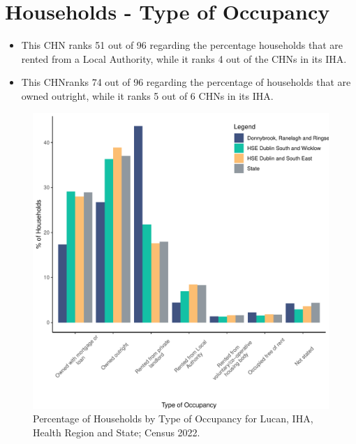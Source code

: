 \documentclass{article}
\begin{document}
\section{Households - Type of Occupancy}\label{sect:Households}
\begin{itemize}
\item This CHN ranks  51 out of 96 regarding the percentage households that are rented from a Local Authority, while it ranks  4 out of the CHNs in its IHA. 
\item This CHNranks  74 out of 96 regarding the percentage of households that are owned outright, while it ranks   5 out of 6 CHNs in its IHA.
\end{itemize}
\begin{figure}[H]
	\centering
	\includegraphics[width = 140mm]{../figures/HouseholdsED.pdf}
	\caption{Percentage of Households by Type of Occupancy for Lucan, IHA, Health Region and State; Census 2022.}
	\label{fig:vbnv}
	\end{figure}
\end{document}
